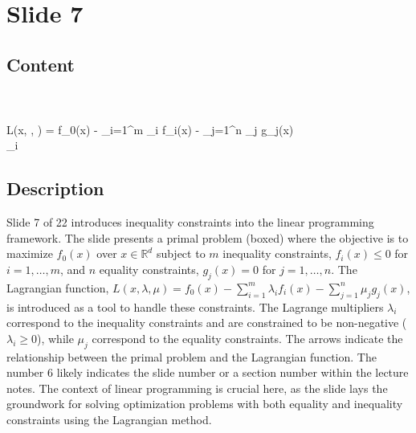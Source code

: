 \documentclass{article}%
\begin{document}
%
\newpage%
\section{Slide 7}%
\label{sec:Slide7}%
\subsection{Content}%

 \\
 \\
L(x, \lambda, \mu) = f_0(x) - \sum_{i=1}^m \lambda_i f_i(x) - \sum_{j=1}^n \mu_j g_j(x) \\
 \quad \lambda_i 
%
\subsection{Description}%
Slide 7 of 22 introduces inequality constraints into the linear programming framework.  The slide presents a primal problem (boxed) where the objective is to maximize $f_0(x)$ over $x \in \mathbb{R}^d$ subject to $m$ inequality constraints, $f_i(x) \le 0$ for $i = 1, \dots, m$, and $n$ equality constraints, $g_j(x) = 0$ for $j = 1, \dots, n$.  The Lagrangian function, $L(x, \lambda, \mu) = f_0(x) - \sum_{i=1}^m \lambda_i f_i(x) - \sum_{j=1}^n \mu_j g_j(x)$, is introduced as a tool to handle these constraints.  The Lagrange multipliers $\lambda_i$ correspond to the inequality constraints and are constrained to be non-negative ($\lambda_i \ge 0$), while $\mu_j$ correspond to the equality constraints.  The arrows indicate the relationship between the primal problem and the Lagrangian function. The number 6 likely indicates the slide number or a section number within the lecture notes. The context of linear programming is crucial here, as the slide lays the groundwork for solving optimization problems with both equality and inequality constraints using the Lagrangian method.%
\end{document}
